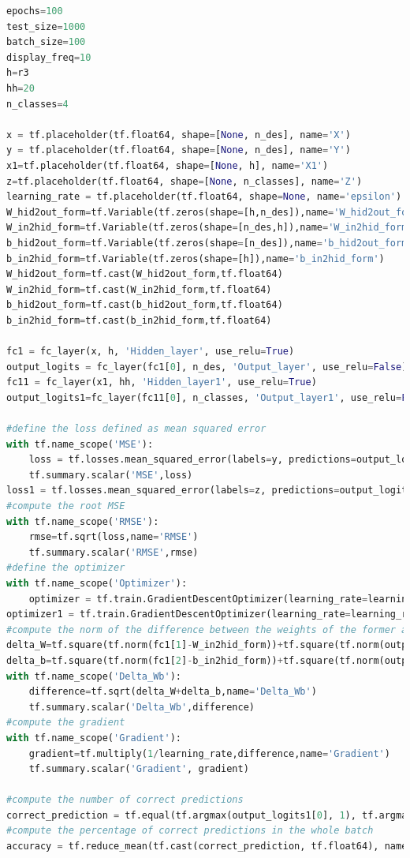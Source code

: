 \documentclass{article}
\begin{document}
\begin{lstlisting}[language=Python]
epochs=100
test_size=1000
batch_size=100
display_freq=10
h=r3
hh=20
n_classes=4

x = tf.placeholder(tf.float64, shape=[None, n_des], name='X')
y = tf.placeholder(tf.float64, shape=[None, n_des], name='Y')
x1=tf.placeholder(tf.float64, shape=[None, h], name='X1')
z=tf.placeholder(tf.float64, shape=[None, n_classes], name='Z')
learning_rate = tf.placeholder(tf.float64, shape=None, name='epsilon')
W_hid2out_form=tf.Variable(tf.zeros(shape=[h,n_des]),name='W_hid2out_form')
W_in2hid_form=tf.Variable(tf.zeros(shape=[n_des,h]),name='W_in2hid_form')
b_hid2out_form=tf.Variable(tf.zeros(shape=[n_des]),name='b_hid2out_form')
b_in2hid_form=tf.Variable(tf.zeros(shape=[h]),name='b_in2hid_form')
W_hid2out_form=tf.cast(W_hid2out_form,tf.float64)
W_in2hid_form=tf.cast(W_in2hid_form,tf.float64)
b_hid2out_form=tf.cast(b_hid2out_form,tf.float64)
b_in2hid_form=tf.cast(b_in2hid_form,tf.float64)

fc1 = fc_layer(x, h, 'Hidden_layer', use_relu=True)
output_logits = fc_layer(fc1[0], n_des, 'Output_layer', use_relu=False)
fc11 = fc_layer(x1, hh, 'Hidden_layer1', use_relu=True)
output_logits1=fc_layer(fc11[0], n_classes, 'Output_layer1', use_relu=False)

#define the loss defined as mean squared error
with tf.name_scope('MSE'):
    loss = tf.losses.mean_squared_error(labels=y, predictions=output_logits[0])
    tf.summary.scalar('MSE',loss)
loss1 = tf.losses.mean_squared_error(labels=z, predictions=output_logits1[0])
#compute the root MSE
with tf.name_scope('RMSE'):
    rmse=tf.sqrt(loss,name='RMSE')
    tf.summary.scalar('RMSE',rmse)
#define the optimizer
with tf.name_scope('Optimizer'):
    optimizer = tf.train.GradientDescentOptimizer(learning_rate=learning_rate, name='Op').minimize(loss)
optimizer1 = tf.train.GradientDescentOptimizer(learning_rate=learning_rate, name='Op').minimize(loss1)
#compute the norm of the difference between the weights of the former and the present batches
delta_W=tf.square(tf.norm(fc1[1]-W_in2hid_form))+tf.square(tf.norm(output_logits[1]-W_hid2out_form))
delta_b=tf.square(tf.norm(fc1[2]-b_in2hid_form))+tf.square(tf.norm(output_logits[2]-b_hid2out_form))
with tf.name_scope('Delta_Wb'):
    difference=tf.sqrt(delta_W+delta_b,name='Delta_Wb')
    tf.summary.scalar('Delta_Wb',difference)
#compute the gradient
with tf.name_scope('Gradient'):
    gradient=tf.multiply(1/learning_rate,difference,name='Gradient')
    tf.summary.scalar('Gradient', gradient)

#compute the number of correct predictions
correct_prediction = tf.equal(tf.argmax(output_logits1[0], 1), tf.argmax(z, 1), name='co_pre')
#compute the percentage of correct predictions in the whole batch
accuracy = tf.reduce_mean(tf.cast(correct_prediction, tf.float64), name='accuracy')


\end{lstlisting}
\end{document}
